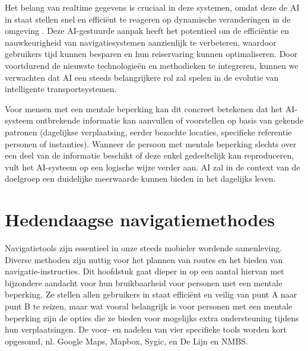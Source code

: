 Het belang van realtime gegevens is cruciaal in deze systemen, omdat deze de AI in staat stellen snel en efficiënt te reageren op dynamische veranderingen in de omgeving \autocite{Ciravegna2018}. Deze AI-gestuurde aanpak heeft het potentieel om de efficiëntie en nauwkeurigheid van navigatiesystemen aanzienlijk te verbeteren, waardoor gebruikers tijd kunnen besparen en hun reiservaring kunnen optimaliseren. Door voortdurend de nieuwste technologieën en methodieken te integreren, kunnen we verwachten dat AI een steeds belangrijkere rol zal spelen in de evolutie van intelligente transportsystemen.

Voor mensen met een mentale beperking kan dit concreet betekenen dat het AI-systeem ontbrekende informatie kan aanvullen of voorstellen op basis van gekende patronen (dagelijkse verplaatsing, eerder bezochte locaties, specifieke referentie personen of instanties). Wanneer de persoon met mentale beperking slechts over een deel van de informatie beschikt of deze enkel gedeeltelijk kan reproduceren, vult het AI-systeem op een logische wijze verder aan. AI zal in de context van de doelgroep een duidelijke meerwaarde kunnen bieden in het dagelijks leven.



\section{Hedendaagse navigatiemethodes}
\label{sec:literatuuroverzicht}


Navigatietools zijn essentieel in onze steeds mobieler wordende samenleving. Diverse methoden zijn nuttig voor het plannen van routes en het bieden van navigatie-instructies. Dit hoofdstuk gaat dieper in op een aantal hiervan met bijzondere aandacht voor hun bruikbaarheid voor personen met een mentale beperking.  Ze stellen allen gebruikers in staat efficiënt en veilig van punt A naar punt B te reizen, maar wat vooral belangrijk is voor personen met een mentale beperking zijn de opties die ze bieden voor mogelijks extra ondersteuning tijdens hun verplaatsingen. De voor- en nadelen van vier specifieke tools worden kort opgesomd, nl. Google Maps, Mapbox, Sygic, en De Lijn en NMBS.

